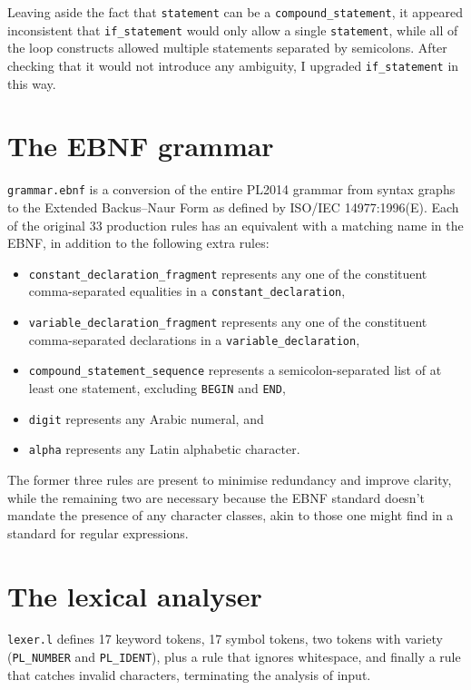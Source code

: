 \documentclass[a4paper,titlepage,12pt]{article}
\begin{document}
Leaving aside the fact that \texttt{statement} can be a
\texttt{compound\_statement}, it appeared inconsistent that
\texttt{if\_statement} would only allow a single \texttt{statement},
while all of the loop constructs allowed multiple statements separated
by semicolons. After checking that it would not introduce any
ambiguity, I upgraded \texttt{if\_statement} in this way.

\newpage

\section{The EBNF grammar}

\texttt{grammar.ebnf} is a conversion of the entire PL2014 grammar from
syntax graphs to the Extended Backus--Naur Form as defined by ISO/IEC
14977:1996(E). Each of the original 33 production rules has an
equivalent with a matching name in the EBNF, in addition to the
following extra rules:

\begin{itemize}
	\item\texttt{constant\_declaration\_fragment} represents any
	     one of the constituent comma-separated equalities in a
	     \texttt{constant\_declaration},
	\item\texttt{variable\_declaration\_fragment} represents any
	     one of the constituent comma-separated declarations in a
	     \texttt{variable\_declaration},
	\item\texttt{compound\_statement\_sequence} represents a
	     semicolon-separated list of at least one statement,
	     excluding \texttt{BEGIN} and \texttt{END},
	\item\texttt{digit} represents any Arabic numeral, and
	\item\texttt{alpha} represents any Latin alphabetic character.
\end{itemize}

The former three rules are present to minimise redundancy and improve
clarity, while the remaining two are necessary because the EBNF
standard doesn't mandate the presence of any character classes, akin
to those one might find in a standard for regular expressions.

\section{The lexical analyser}

\texttt{lexer.l} defines 17 keyword tokens, 17 symbol tokens, two
tokens with variety (\texttt{PL\_NUMBER} and \texttt{PL\_IDENT}), plus
a rule that ignores whitespace, and finally a rule that catches invalid
characters, terminating the analysis of input.
\end{document}
